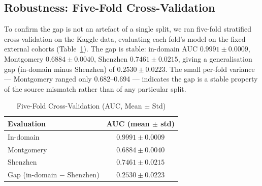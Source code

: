 \documentclass[journal]{IEEEtran}
\begin{document}
\subsection{Robustness: Five-Fold Cross-Validation}
To confirm the gap is not an artefact of a single split, we ran five-fold
stratified cross-validation on the Kaggle data, evaluating each fold's model on
the fixed external cohorts (Table~\ref{tab:cv}). The gap is stable: in-domain
AUC $0.9991 \pm 0.0009$, Montgomery $0.6884 \pm 0.0040$, Shenzhen
$0.7461 \pm 0.0215$, giving a generalisation gap (in-domain minus Shenzhen) of
$0.2530 \pm 0.0223$. The small per-fold variance --- Montgomery ranged only
0.682--0.694 --- indicates the gap is a stable property of the source mismatch
rather than of any particular split.

\begin{table}[!t]
\caption{Five-Fold Cross-Validation (AUC, Mean $\pm$ Std)}
\label{tab:cv}
\centering
\begin{tabular}{lc}
\toprule
Evaluation & AUC (mean $\pm$ std) \\
\midrule
In-domain & $0.9991 \pm 0.0009$ \\
Montgomery & $0.6884 \pm 0.0040$ \\
Shenzhen & $0.7461 \pm 0.0215$ \\
Gap (in-domain $-$ Shenzhen) & $0.2530 \pm 0.0223$ \\
\bottomrule
\end{tabular}
\end{table}
\end{document}
